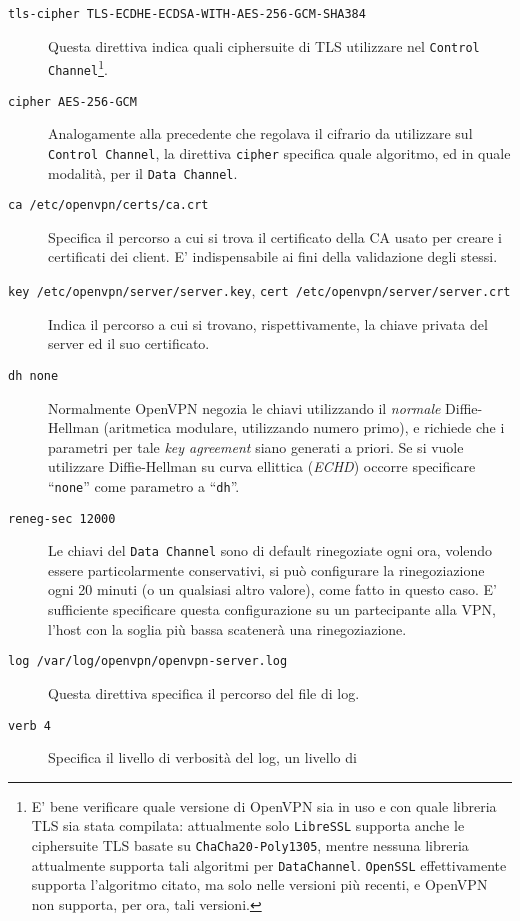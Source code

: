 \begin{description}
  \item[\texttt{tls-cipher TLS-ECDHE-ECDSA-WITH-AES-256-GCM-SHA384}]Questa direttiva
  indica quali ciphersuite di TLS utilizzare nel \texttt{Control Channel}\footnote{E' bene
  verificare quale versione di OpenVPN sia in uso e con quale libreria TLS sia
  stata compilata: attualmente solo \texttt{LibreSSL} supporta anche le ciphersuite TLS
  basate su \texttt{ChaCha20-Poly1305}, mentre nessuna libreria attualmente supporta
  tali algoritmi per \texttt{DataChannel}. \texttt{OpenSSL} effettivamente supporta
  l'algoritmo citato, ma solo nelle versioni più recenti, e OpenVPN non supporta, per ora,
  tali versioni.}.
  \item[\texttt{cipher AES-256-GCM}]Analogamente alla precedente che regolava il cifrario
  da utilizzare sul \texttt{Control Channel}, la direttiva \texttt{cipher} specifica
  quale algoritmo, ed in quale modalità, per il \texttt{Data Channel}.
  \item[\texttt{ca /etc/openvpn/certs/ca.crt}]Specifica il percorso a cui si trova
  il certificato della CA usato per creare i certificati dei client. E' indispensabile
  ai fini della validazione degli stessi.
  \item[\texttt{key /etc/openvpn/server/server.key}, \texttt{cert /etc/openvpn/server/server.crt}]
  Indica il percorso a cui si trovano,
  rispettivamente, la chiave privata del server ed il suo certificato.
  \item[\texttt{dh none}]Normalmente OpenVPN negozia le chiavi utilizzando il \textit{normale}
  Diffie-Hellman (aritmetica modulare, utilizzando numero primo), e richiede che i parametri
  per tale \textit{key agreement} siano generati a priori. Se si vuole utilizzare
  Diffie-Hellman su curva ellittica (\textit{ECHD}) occorre specificare ``\texttt{none}''
  come parametro a ``\texttt{dh}''.
  \item[\texttt{reneg-sec 12000}]Le chiavi del \texttt{Data Channel} sono di default rinegoziate
  ogni ora, volendo essere particolarmente conservativi, si può configurare
  la rinegoziazione ogni 20 minuti (o un qualsiasi altro valore), come fatto in
  questo caso. E' sufficiente specificare questa configurazione su un partecipante
  alla VPN, l'host con la soglia più bassa scatenerà una rinegoziazione.
  \item[\texttt{log /var/log/openvpn/openvpn-server.log}]Questa direttiva specifica
  il percorso del file di log.
  \item[\texttt{verb 4}]Specifica il livello di verbosità del log, un livello di

\end{description}
